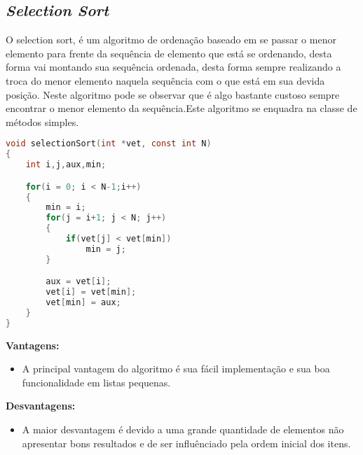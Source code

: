 \documentclass[
	12pt,				%
	oneside,			%
	a4paper,			%
	english,			%
	brazil,				%
	]{article}
\begin{document}
\subsection{\textit{Selection Sort}}
O selection sort, é um algoritmo de ordenação baseado em se passar o menor elemento para frente da sequência de elemento que está se ordenando, desta forma
vai montando sua sequência ordenada, desta forma sempre realizando a troca do menor elemento naquela sequência com o que está em sua devida posição. Neste algoritmo 
pode se observar que é algo bastante custoso sempre encontrar o menor elemento da sequência.Este algoritmo se enquadra na classe de métodos simples.\cite{Selection}
\begin{lstlisting}[language=C, caption=Estrutura \textit{Selection}]
void selectionSort(int *vet, const int N)
{
	int i,j,aux,min;

	for(i = 0; i < N-1;i++)
	{
		min = i;
		for(j = i+1; j < N; j++)
		{
			if(vet[j] < vet[min])
				min = j;
		}

		aux = vet[i];
		vet[i] = vet[min];
		vet[min] = aux;
	}
}
\end{lstlisting}
\textbf{Vantagens:}
\begin{itemize}
 \item A principal vantagem do algoritmo é sua fácil implementação e sua boa funcionalidade em listas pequenas.
\end{itemize}
\textbf{Desvantagens:}
\begin{itemize}
 \item A maior desvantagem é devido a uma grande quantidade de elementos não apresentar bons resultados e de ser influênciado pela ordem inicial dos itens.
\end{itemize}
\end{document}
